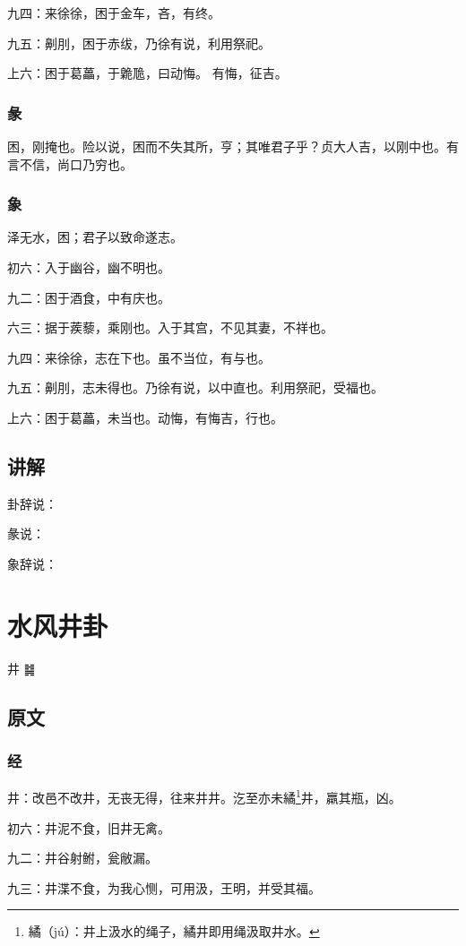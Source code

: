 \documentclass[12pt,oneside]{book}
\begin{document}
九四：来徐徐，困于金车，吝，有终。

九五：劓刖，困于赤绂，乃徐有说，利用祭祀。

上六：困于葛藟，于臲卼，曰动悔。 有悔，征吉。

\subsection{彖}
困，刚掩也。险以说，困而不失其所，亨；其唯君子乎？贞大人吉，以刚中也。有言不信，尚口乃穷也。

\subsection{象}
泽无水，困；君子以致命遂志。

初六：入于幽谷，幽不明也。

九二：困于酒食，中有庆也。

六三：据于蒺藜，乘刚也。入于其宫，不见其妻，不祥也。

九四：来徐徐，志在下也。虽不当位，有与也。

九五：劓刖，志未得也。乃徐有说，以中直也。利用祭祀，受福也。

上六：困于葛藟，未当也。动悔，有悔吉，行也。

\section{讲解}
卦辞说：

彖说：

象辞说：

\chapter{水风井卦}
井 {\Large ䷯}

\section{原文}

\subsection{经}
井：改邑不改井，无丧无得，往来井井。汔至亦未繘\footnote{繘（jú）：井上汲水的绳子，繘井即用绳汲取井水。}井，羸其瓶，凶。

初六：井泥不食，旧井无禽。

九二：井谷射鲋，瓮敝漏。

九三：井渫不食，为我心恻，可用汲，王明，并受其福。
\end{document}
